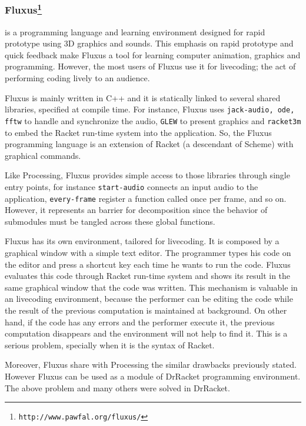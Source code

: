 \subsubsection{Fluxus\protect\footnote{\texttt{http://www.pawfal.org/fluxus/}}} is a programming language and learning environment designed for rapid prototype using 3D graphics and sounds. This emphasis on rapid prototype and quick feedback make Fluxus a tool for learning computer animation, graphics and programming. However, the most users of Fluxus use it for livecoding; the act of performing coding lively to an
audience.

Fluxus is mainly written in C++ and it is statically linked to several shared libraries, specified at compile time. For instance, Fluxus uses \texttt{jack-audio, ode, fftw} to handle and synchronize the audio, \texttt{GLEW} to present graphics and \texttt{racket3m} to embed the Racket run-time system into the application. So, the Fluxus programming language is an extension of Racket (a descendant of Scheme) with graphical commands. 

Like Processing, Fluxus provides simple access to those libraries through single entry points, for instance \texttt{start-audio} connects an input audio to the application, \texttt{every-frame} register a function called once per frame, and so on. However, it represents an barrier for decomposition since the behavior of submodules must be tangled across these global functions.

Fluxus has its own environment, tailored for livecoding. It is composed by a graphical window with a simple text editor. The programmer types his code on the editor and press a shortcut key each time he wants to run the code. Fluxus evaluates this code through Racket run-time system and shows its result in the same graphical window that the code was written. This mechanism is valuable in an livecoding environment, because the performer can be editing the code while the result of the previous computation is maintained at background. On other hand, if the code has any errors and the performer execute it, the previous computation disappears and the environment will not help to find it. This is a serious problem, specially when it is the syntax of Racket.

Moreover, Fluxus share with Processing the similar drawbacks previously stated. However Fluxus can be used as a module of DrRacket programming environment. The above problem and many others were solved in DrRacket.
